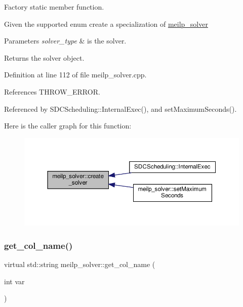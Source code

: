 Factory static member function. 

Given the supported enum create a specialization of \hyperlink{classmeilp__solver}{meilp\+\_\+solver} 
\begin{DoxyParams}{Parameters}
{\em solver\+\_\+type} & is the solver. \\
\hline
\end{DoxyParams}
\begin{DoxyReturn}{Returns}
the solver object. 
\end{DoxyReturn}


Definition at line 112 of file meilp\+\_\+solver.\+cpp.



References T\+H\+R\+O\+W\+\_\+\+E\+R\+R\+OR.



Referenced by S\+D\+C\+Scheduling\+::\+Internal\+Exec(), and set\+Maximum\+Seconds().

Here is the caller graph for this function\+:
\nopagebreak
\begin{figure}[H]
\begin{center}
\leavevmode
\includegraphics[width=350pt]{dc/d7f/classmeilp__solver_a77048480479b25895144987d41b9098b_icgraph}
\end{center}
\end{figure}
\mbox{\label{classmeilp__solver_a8bed22d1f0a2a87868f46089c57a6add}} 
\subsubsection{\texorpdfstring{get\+\_\+col\+\_\+name()}{get\_col\_name()}}
{\footnotesize\ttfamily virtual std\+::string meilp\+\_\+solver\+::get\+\_\+col\+\_\+name (\begin{DoxyParamCaption}\item[{int}]{var }\end{DoxyParamCaption})\hspace{0.3cm}{\ttfamily [pure virtual]}}



